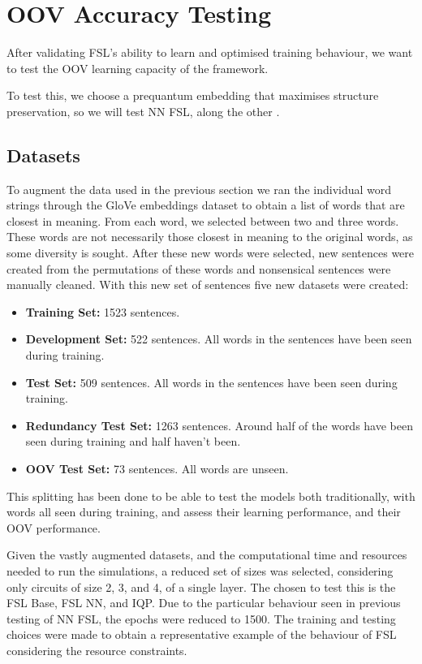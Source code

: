 \section{OOV Accuracy Testing}
After validating FSL's ability to learn and optimised training behaviour, we want to test the OOV learning capacity of the framework.

To test this, we choose a prequantum embedding that maximises structure preservation, so we will test NN FSL, along the other \mya.

\subsection{Datasets}

To augment the data used in the previous section we ran the individual word strings through the GloVe embeddings dataset to obtain a list of words that are closest in meaning. From each word, we selected between two and three words. These words are not necessarily those closest in meaning to the original words, as some diversity is sought. After these new words were selected, new sentences were created from the permutations of these words and nonsensical sentences were manually cleaned. With this new set of sentences five new datasets were created:

\begin{itemize}
    \item \textbf{Training Set:} 1523 sentences.
    \item \textbf{Development Set:} 522 sentences. All words in the sentences have been seen during training.
    \item \textbf{Test Set:} 509 sentences. All words in the sentences have been seen during training.
    \item \textbf{Redundancy Test Set:} 1263 sentences. Around half of the words have been seen during training and half haven't been.
    \item \textbf{OOV Test Set:} 73 sentences. All words are unseen.
\end{itemize}

This splitting has been done to be able to test the models both traditionally, with words all seen during training, and assess their learning performance, and their OOV performance.

Given the vastly augmented datasets, and the computational time and resources needed to run the simulations, a reduced set of sizes was selected, considering only circuits of size 2, 3, and 4, of a single layer. The \mya chosen to test this is the FSL Base, FSL NN, and IQP. Due to the particular behaviour seen in previous testing of NN FSL, the epochs were reduced to 1500. The training and testing choices were made to obtain a representative example of the behaviour of FSL considering the resource constraints.

